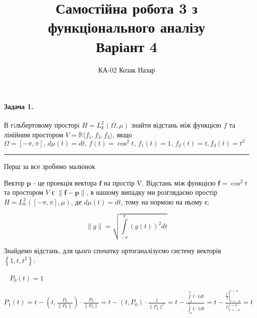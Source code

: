 \documentclass[a5paper, 20pt, titlepage]{article}
\title{Самостійна робота 3 з функціонального аналізу \\ Варіант 4}
\author{\vspace{-4mm} КА-02 Козак Назар}
\date{}
\newcommand{\ff}{\textbf{f}}
\newcommand{\p}{\textbf{p}}
\begin{document}
\maketitle

\paragraph{Задача 1.} \hfill \nolinebreak В гiльбертовому просторi $H = L^2_{\mathbb{R}}(\Omega, \mu)$ знайти відстань між функцією $f$ та лінійним простором $V = \mathbb{R} \langle f_1 , f_2, f_3\rangle$, якщо $\Omega = [-\pi, \pi], \, d \mu(t) = dt, \, f(t) = \cos^2 t, \, f_1(t) = 1, \, f_2(t) = t, f_3(t) = t^2$

\noindent\rule{4cm}{0.4pt}

Перш за все зробимо малюнок

\begin{figure}[!h]
\centering
{}
\end{figure}

Вектор $\p$ - це проекція вектора $\ff$ на простір V. Відстань між функцією $\ff = \cos^2 t$ та простором $V$ є $\| \ff - \p \|$, в нашому випадку ми розглядаємо простір $H = L^2_{\mathbb{R}}([-\pi, \pi], \mu)$, де $d \mu(t) = dt$, тому на нормою на ньому є:

$$ \| g \| = \sqrt{\int \limits_{-\pi}^{\pi} \left( g(t) \right)^2 dt}$$

Знайдемо відстань, для цього спочатку ортоганалізуємо систему векторів $\left\{ 1, t, t^2\right\}$:

\vspace{4mm}\
\hspace{4mm}
$P_0(t) = 1$

\hspace{5mm}
$P_1(t) = t - \left(t, \frac{P_0}{\| P_0 \|} \right) \cdot \frac{P_0}{\|P_0 \|} = t - \left(t, P_0 \right) \cdot \frac{1}{\|P_0\|^2} = t - \frac{\int \limits_{-\pi}^{\pi} t \cdot 1 dt}{\int \limits_{-\pi}^{\pi} 1 \cdot 1 dt} = t - \frac{\left. \frac{t^2}{2} \right|_{t = -\pi}^{t = \pi}}{\left. t \right|_{t = -\pi}^{t = \pi}} = t$ 
\end{document}
